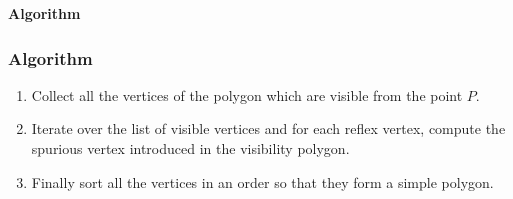 \documentclass{beamer}
\begin{document}

\frame
{

{\bf Algorithm}
\frametitle{Algorithm}

\begin{enumerate}
 \item 
Collect all the vertices of the polygon which are visible from the point $P$.
\item
Iterate over the list of visible vertices and for each reflex vertex, compute the spurious vertex introduced in the visibility polygon.
\item
Finally sort all the vertices in an order so that they form a simple polygon.
\end{enumerate}

}
\end{document}
